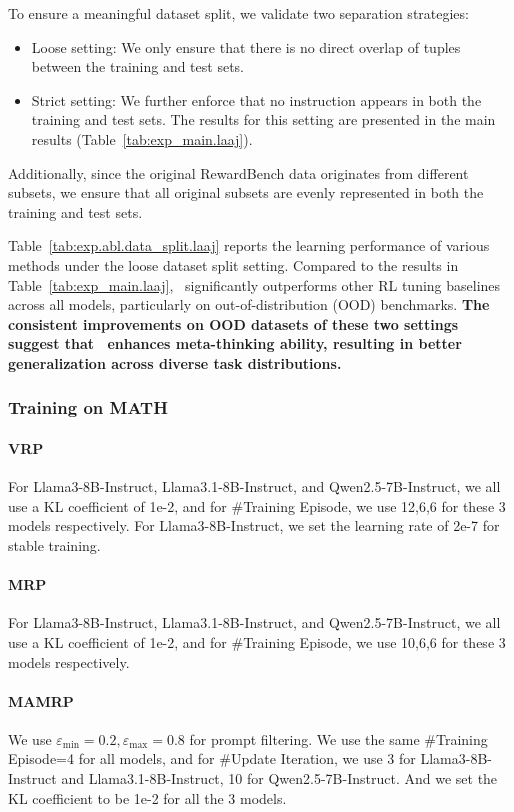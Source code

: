 To ensure a meaningful dataset split, we validate two separation strategies:
\begin{itemize}
\item Loose setting: We only ensure that there is no direct overlap of tuples between the training and test sets.
\item Strict setting: We further enforce that no instruction appears in both the training and test sets. The results for this setting are presented in the main results (Table~\ref{tab:exp_main.laaj}).
\end{itemize}
Additionally, since the original RewardBench data originates from different subsets, we ensure that all original subsets are evenly represented in both the training and test sets.

Table~\ref{tab:exp.abl.data_split.laaj} reports the learning performance of various methods under the loose dataset split setting.
Compared to the results in Table~\ref{tab:exp_main.laaj}, \method~significantly outperforms other RL tuning baselines across all models, particularly on out-of-distribution (OOD) benchmarks. \textbf{The consistent improvements on OOD datasets of these two settings suggest that \method~enhances meta-thinking ability, resulting in better generalization across diverse task distributions.}



\subsubsection{Training on MATH}
\label{app:exp_setting.single_turn_rema.math}
\paragraph{VRP}
For Llama3-8B-Instruct, Llama3.1-8B-Instruct, and Qwen2.5-7B-Instruct, we all use a KL coefficient of 1e-2, and for \#Training Episode, we use 12,6,6 for these 3 models respectively. For Llama3-8B-Instruct, we set the learning rate of 2e-7 for stable training.
\paragraph{MRP}
For Llama3-8B-Instruct, Llama3.1-8B-Instruct, and Qwen2.5-7B-Instruct, we all use a KL coefficient of 1e-2, and for \#Training Episode, we use 10,6,6 for these 3 models respectively. 
\paragraph{MAMRP}
We use $\varepsilon_{\min}=0.2, \varepsilon_{\max}=0.8$ for prompt filtering.
We use the same \#Training Episode=4 for all models, and for \#Update Iteration, we use 3 for Llama3-8B-Instruct and Llama3.1-8B-Instruct, 10 for Qwen2.5-7B-Instruct. And we set the KL coefficient to be 1e-2 for all the 3 models.

